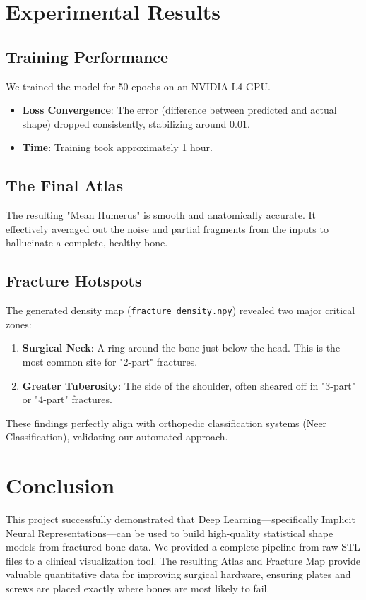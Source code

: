 \documentclass[12pt]{article}
\begin{document}
\section{Experimental Results}

\subsection{Training Performance}
We trained the model for 50 epochs on an NVIDIA L4 GPU.
\begin{itemize}
    \item \textbf{Loss Convergence}: The error (difference between predicted and actual shape) dropped consistently, stabilizing around 0.01.
    \item \textbf{Time}: Training took approximately 1 hour.
\end{itemize}

\subsection{The Final Atlas}
The resulting "Mean Humerus" is smooth and anatomically accurate. It effectively averaged out the noise and partial fragments from the inputs to hallucinate a complete, healthy bone.

\subsection{Fracture Hotspots}
The generated density map (\texttt{fracture\_density.npy}) revealed two major critical zones:
\begin{enumerate}
    \item \textbf{Surgical Neck}: A ring around the bone just below the head. This is the most common site for "2-part" fractures.
    \item \textbf{Greater Tuberosity}: The side of the shoulder, often sheared off in "3-part" or "4-part" fractures.
\end{enumerate}
These findings perfectly align with orthopedic classification systems (Neer Classification), validating our automated approach.

\section{Conclusion}
This project successfully demonstrated that Deep Learning—specifically Implicit Neural Representations—can be used to build high-quality statistical shape models from fractured bone data. We provided a complete pipeline from raw STL files to a clinical visualization tool. The resulting Atlas and Fracture Map provide valuable quantitative data for improving surgical hardware, ensuring plates and screws are placed exactly where bones are most likely to fail.
\end{document}

